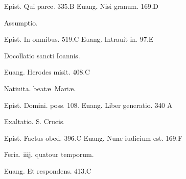 \documentclass[a5paper,10pt]{book}
\def\ae{æ}
\begin{document}
\begin{multicols}{2}
\vspace{-.75em}
\par \noindent Epist. Qui parce. \hfill 335.B
\newline Euang. Nisi granum. \hfill 169.D
\newline \vspace{-1.75em}
\begin{center}
\color{red} Assumptio.
\end{center}
\vspace{-.75em}
\par \noindent Epist. In omnibus. \hfill 519.C
\newline Euang. Intrauit in. \hfill 97.E
\newline \vspace{-1.75em}
\begin{center}
\color{red} Docollatio sancti Ioannis.
\end{center}
\vspace{-.75em}
\par \noindent Euang. Herodes misit. \hfill 408.C
\newline \vspace{-1.75em}
\begin{center}
\color{red} Natiuita. beat\ae \ Mari\ae .
\end{center}
\vspace{-.75em}
\par \noindent Epist. Domini. poss. \hfill 108.
\newline Euang. Liber generatio. \hfill 340 A%
\newline \vspace{-1.75em}
\begin{center}
\color{red} Exaltatio. S. Crucis.
\end{center}
\vspace{-.75em}
\par \noindent Epist. Factus obed. \hfill 396.C
\newline Euang. Nunc iudicium est. \hfill 169.F
\newline \vspace{-1.75em}
\begin{center}
\color{red} Feria. iiij. quatour temporum.
\end{center}
\vspace{-.75em}
\par \noindent Euang. Et respondens. \hfill 413.C
\newline \vspace{-1.75em}
\begin{center}

\end{center}
\end{multicols}
\end{document}
